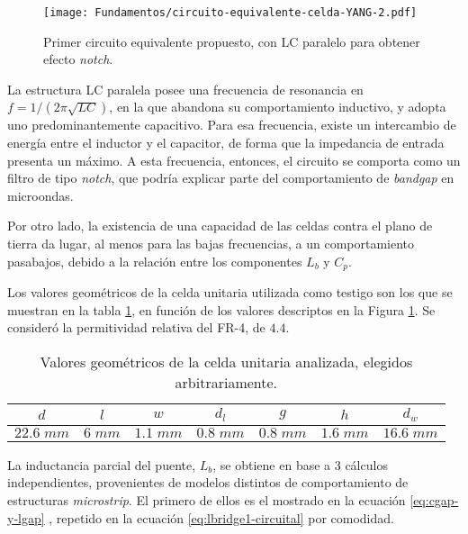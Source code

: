 \begin{figure}[h]
	\centering
	\texttt{[image: Fundamentos/circuito-equivalente-celda-YANG-2.pdf]}
	\caption{Primer circuito equivalente propuesto, con LC paralelo para obtener efecto \textit{notch}.}
	\label{fig:primerCircuitoPropuesto}
\end{figure}

La estructura LC paralela posee una frecuencia de resonancia en $f=1/(2 \pi \sqrt{LC})$, en la que abandona su comportamiento inductivo, y adopta uno predominantemente capacitivo. Para esa frecuencia, existe un intercambio de energía entre el inductor y el capacitor, de forma que la impedancia de entrada presenta un máximo. A esta frecuencia, entonces, el circuito se comporta como un filtro de tipo \textit{notch}, que podría explicar parte del comportamiento de \textit{bandgap} en microondas.

Por otro lado, la existencia de una capacidad de las celdas contra el plano de tierra da lugar, al menos para las bajas frecuencias, a un comportamiento pasabajos, debido a la relación entre los componentes $L_b$ y $C_p$.

Los valores geométricos de la celda unitaria utilizada como testigo son los que se muestran en la tabla \ref{table:CeldaUnitariaAnalisisiCircuital}, en función de los valores descriptos en la Figura \ref{fig:primerCircuitoPropuesto}. Se consideró la permitividad relativa del FR-4, de $4.4$.

\begin{table}
	\centering
	\begin{tabular}{|c|c|c|c|c|c|c|}
		
		\hline
		$d$ & $l$ & $w$ & $d_l$ & $g$ & $h$ & $d_w$\\ 
		\hline
		$22.6\;mm$ & $6\;mm$ & $1.1\;mm$ & $0.8\;mm$ & $0.8\;mm$ & $1.6\;mm$ & $16.6\;mm$\\ 
		\hline 
	\end{tabular}
	\caption{Valores geométricos de la celda unitaria analizada, elegidos arbitrariamente.}
	\label{table:CeldaUnitariaAnalisisiCircuital}
\end{table}

La inductancia parcial del puente, $L_b$, se obtiene en base a 3 cálculos independientes, provenientes de modelos distintos de comportamiento de estructuras \textit{microstrip}. El primero de ellos es el mostrado en la ecuación \ref{eq:cgap-y-lgap} \cite{KimSchuttAine:AnalysisHybrid}, repetido en la ecuación \ref{eq:lbridge1-circuital} por comodidad.

